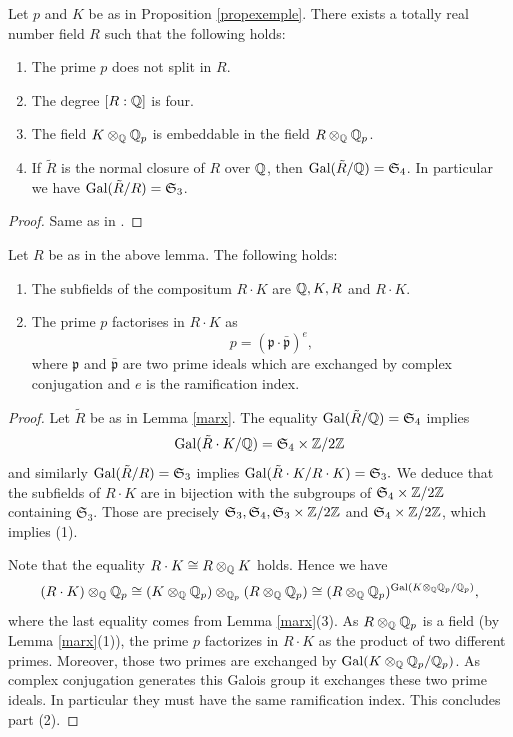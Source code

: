 \begin{lemma}
\notready\label{marx}
Let $p$ and $K$ be as in Proposition \ref{propexemple}. There exists a totally real number field $R$  such that the following holds:
\begin{enumerate}
\item  The prime $p$ does not split in $R$.
\item The degree $[R:\mathbb{Q}]$ is four.
\item The field $K \otimes_{\mathbb{Q}} \mathbb{Q}_p$ is embeddable in the field $R \otimes_{\mathbb{Q}} \mathbb{Q}_p$.
\item If $\tilde{R}$ is the normal closure of $R$ over $\mathbb{Q}$, then $\textnormal{Gal}(\tilde{R}/\mathbb{Q})=\mathfrak{S}_4$. In particular we have $\textnormal{Gal}(\tilde{R}/R)=\mathfrak{S}_3$.
\end{enumerate}
\end{lemma}
\begin{proof}
Same as in \cite[\S 3]{LeOo}.
\end{proof}

\begin{lemma}
\notready\label{lenin}
Let $R$ be as in the above lemma. The following holds:
\begin{enumerate}
\item  The subfields of the compositum $R\cdot K$ are $\mathbb{Q},K,R$ and $R\cdot K$.
\item The prime $p$ factorises in $R\cdot K$ as
\[p=(\mathfrak{p}\cdot \bar{\mathfrak{p}})^e,\]
where $\mathfrak{p}$ and $\bar{\mathfrak{p}}$ are  two prime ideals which are exchanged by  complex conjugation and $e$ is  the ramification index.
\end{enumerate}
\end{lemma}
\begin{proof}
Let $\tilde{R}$ be as in Lemma \ref{marx}. The equality $\textnormal{Gal}(\tilde{R}/\mathbb{Q})=\mathfrak{S}_4$ implies
\[\textnormal{Gal}(\tilde{R}\cdot K/\mathbb{Q})=\mathfrak{S}_4\times \mathbb{Z}/2\mathbb{Z}\]
and similarly $\textnormal{Gal}(\tilde{R}/R)=\mathfrak{S}_3$ implies $\textnormal{Gal}(\tilde{R}\cdot K/R \cdot K)=\mathfrak{S}_3.$
We deduce that the subfields of $R\cdot K$ are in bijection with the subgroups of $\mathfrak{S}_4\times \mathbb{Z}/2\mathbb{Z}$ containing $\mathfrak{S}_3$. Those are precisely $\mathfrak{S}_3 , \mathfrak{S}_4, \mathfrak{S}_3\times \mathbb{Z}/2\mathbb{Z}$ and $\mathfrak{S}_4\times \mathbb{Z}/2\mathbb{Z}$, which implies (1).

Note that  the equality $R\cdot K \cong R \otimes_{\mathbb{Q}} K$ holds. Hence we have
\[(R\cdot K) \otimes_{\mathbb{Q}} \mathbb{Q}_p \cong  (K \otimes_{\mathbb{Q}} \mathbb{Q}_p) \otimes_{\mathbb{Q}_p} (R \otimes_{\mathbb{Q}} \mathbb{Q}_p) \cong (R \otimes_{\mathbb{Q}} \mathbb{Q}_p)^{\textnormal{Gal}(K \otimes_{\mathbb{Q}} \mathbb{Q}_p/\mathbb{Q}_p) }, \]
where the last equality comes from  Lemma \ref{marx}(3). As ${R \otimes_{\mathbb{Q}} \mathbb{Q}_p}$ is a field (by Lemma \ref{marx}(1)), the prime $p$ factorizes in $R\cdot K$ as the product of two different primes. Moreover, those two primes are exchanged by $\textnormal{Gal}(K \otimes_{\mathbb{Q}} \mathbb{Q}_p/\mathbb{Q}_p)$. As complex conjugation generates this Galois group it exchanges these two prime ideals. In particular they must have the same ramification index. This concludes part (2).
\end{proof}

